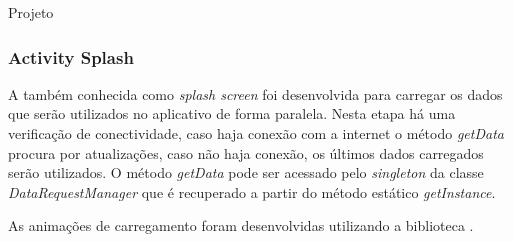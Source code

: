 \documentclass[
	12pt,				%
	openright,			%
	twoside,			%
	a4paper,			%
	english,			%
	french,				%
	spanish,			%
	brazil				%
	]{abntex2}
\begin{document}
\begin{chapter}{Projeto}
\subsubsection{Activity Splash} \label{splash_activity}
A  também conhecida como \textit{splash screen} foi desenvolvida para carregar os dados que serão utilizados no aplicativo de forma paralela. Nesta etapa há uma verificação de conectividade, caso haja conexão com a internet o método \textit{getData} procura por atualizações, caso não haja conexão, os últimos dados carregados serão utilizados. O método \textit{getData} pode ser acessado pelo \textit{singleton} da classe \textit{DataRequestManager} que é recuperado a partir do método estático \textit{getInstance}. 

As animações de carregamento foram desenvolvidas utilizando a biblioteca .


\end{chapter}
\end{document}

